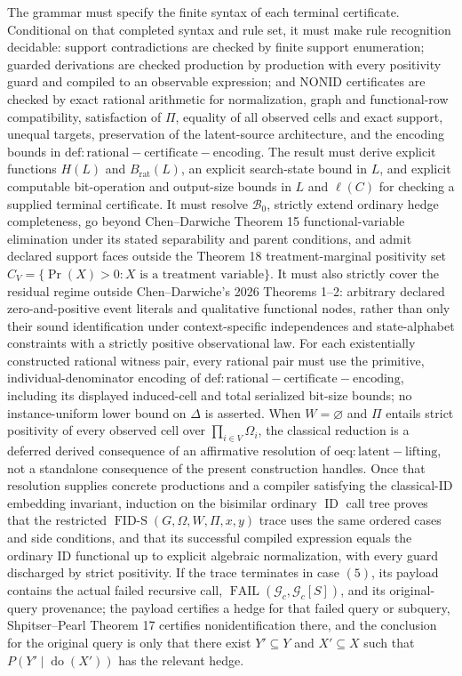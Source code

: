 The grammar must specify the finite syntax of each terminal certificate. Conditional on that completed syntax and rule set, it must make rule recognition decidable: support contradictions are checked by finite support enumeration; guarded derivations are checked production by production with every positivity guard and compiled to an observable expression; and NONID certificates are checked by exact rational arithmetic for normalization, graph and functional-row compatibility, satisfaction of \(\Pi\), equality of all observed cells and exact support, unequal targets, preservation of the latent-source architecture, and the encoding bounds in \(\mathrm{def:rational-certificate-encoding}\). The result must derive explicit functions \(H(L)\) and \(B_{\mathrm{rat}}(L)\), an explicit search-state bound in \(L\), and explicit computable bit-operation and output-size bounds in \(L\) and \(\ell(C)\) for checking a supplied terminal certificate. It must resolve \(\mathcal B_0\), strictly extend ordinary hedge completeness, go beyond Chen--Darwiche Theorem 15 functional-variable elimination under its stated separability and parent conditions, and admit declared support faces outside the Theorem 18 treatment-marginal positivity set \(C_V=\{\Pr(X)>0:X\text{ is a treatment variable}\}\). It must also strictly cover the residual regime outside Chen--Darwiche's 2026 Theorems 1--2: arbitrary declared zero-and-positive event literals and qualitative functional nodes, rather than only their sound identification under context-specific independences and state-alphabet constraints with a strictly positive observational law. For each existentially constructed rational witness pair, every rational pair must use the primitive, individual-denominator encoding of \(\mathrm{def:rational-certificate-encoding}\), including its displayed induced-cell and total serialized bit-size bounds; no instance-uniform lower bound on \(\Delta\) is asserted.
When \(W=\varnothing\) and \(\Pi\) entails strict positivity of every observed cell over \(\prod_{i\in V}\Omega_i\), the classical reduction is a deferred derived consequence of an affirmative resolution of \(\mathrm{oeq:latent-lifting}\), not a standalone consequence of the present construction handles. Once that resolution supplies concrete productions and a compiler satisfying the classical-ID embedding invariant, induction on the bisimilar ordinary \(\operatorname{ID}\) call tree proves that the restricted \(\operatorname{FID\text{-}S}(G,\Omega,W,\Pi,x,y)\) trace uses the same ordered cases and side conditions, and that its successful compiled expression equals the ordinary ID functional up to explicit algebraic normalization, with every guard discharged by strict positivity. If the trace terminates in case \((5)\), its payload contains the actual failed recursive call, \(\operatorname{FAIL}(\mathcal G_c,\mathcal G_c[S])\), and its original-query provenance; the payload certifies a hedge for that failed query or subquery, Shpitser--Pearl Theorem 17 certifies nonidentification there, and the conclusion for the original query is only that there exist \(Y'\subseteq Y\) and \(X'\subseteq X\) such that \(P(Y'\mid\operatorname{do}(X'))\) has the relevant hedge.
